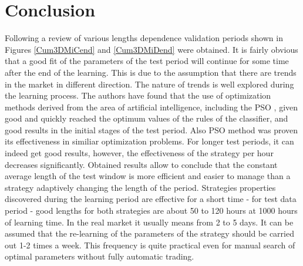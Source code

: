 \documentclass{tewiart}
\begin{document}
\section{Conclusion}

Following a review of various lengths dependence validation periods shown in Figures \ref{Cum3DMiCend} and \ref{Cum3DMiDend} were obtained. It is fairly obvious that a good fit of the parameters of the test period will continue for some time after the end of the learning. This is due to the assumption that there are trends in the market in different direction. The nature of trends is well explored during the learning process. The authors have found that the use of optimization methods derived from the area of artificial intelligence, including the PSO \cite{Kennedy}, given good and quickly reached the optimum values of the rules of the classifier, and good results in the initial stages of the test period. Also PSO method was proven its effectiveness in similiar optimization problems\cite{Chau2007642}\cite{Zhang}. For longer test periods, it can indeed get good results, however, the effectiveness of the strategy per hour decreases significantly. Obtained results allow to conclude that the constant average length of the test window is more efficient and easier to manage than a strategy adaptively changing the length of the period. Strategies properties discovered during the learning period are effective for a short time - for test data period - good lengths for both strategies are about 50 to 120 hours at 1000 hours of learning time. In the real market it usually means from 2 to 5 days. It can be assumed that the re-learning of the parameters of the strategy should be carried out 1-2 times a week. This frequency is quite practical even for manual search of optimal parameters without fully automatic trading.\\
\end{document}
